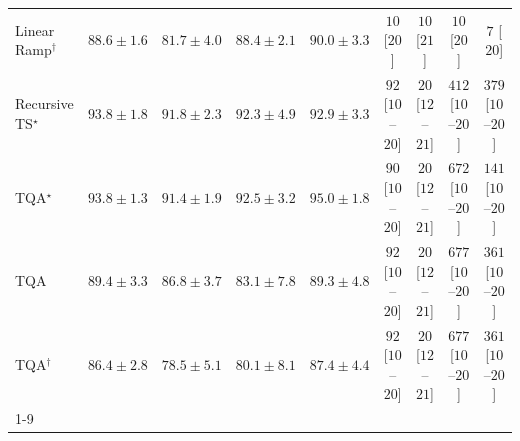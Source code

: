 \begin{tabular}{l|cccc|cccc|}
Linear Ramp$^\dagger$ & {\cellcolor[HTML]{0566A0}} \color[HTML]{F1F1F1} $88.6\pm 1.6$ & {\cellcolor[HTML]{2C89BD}} \color[HTML]{F1F1F1} $81.7\pm 4.0$ & {\cellcolor[HTML]{0567A2}} \color[HTML]{F1F1F1} $88.4\pm 2.1$ & {\cellcolor[HTML]{046198}} \color[HTML]{F1F1F1} $90.0\pm 3.3$ & {\cellcolor[HTML]{FFF6F2}} \color[HTML]{000000} $10$ [$20$] & {\cellcolor[HTML]{FFF6F2}} \color[HTML]{000000} $10$ [$21$] & {\cellcolor[HTML]{FFF6F2}} \color[HTML]{000000} $10$ [$20$] & {\cellcolor[HTML]{FFF6F2}} \color[HTML]{000000} $7$ [$20$] \\
Recursive TS$^\star$ & {\cellcolor[HTML]{034D79}} \color[HTML]{F1F1F1} $93.8\pm 1.8$ & {\cellcolor[HTML]{04598C}} \color[HTML]{F1F1F1} $91.8\pm 2.3$ & {\cellcolor[HTML]{045687}} \color[HTML]{F1F1F1} $92.3\pm 4.9$ & {\cellcolor[HTML]{045382}} \color[HTML]{F1F1F1} $92.9\pm 3.3$ & {\cellcolor[HTML]{FDE2DF}} \color[HTML]{000000} $92$ [$10$--$20$] & {\cellcolor[HTML]{FFF3EF}} \color[HTML]{000000} $20$ [$12$--$21$] & {\cellcolor[HTML]{F15C9F}} \color[HTML]{F1F1F1} $412$ [$10$--$20$] & {\cellcolor[HTML]{F76EA3}} \color[HTML]{F1F1F1} $379$ [$10$--$20$] \\
TQA$^\star$ & {\cellcolor[HTML]{034D79}} \color[HTML]{F1F1F1} $93.8\pm 1.3$ & {\cellcolor[HTML]{045B8F}} \color[HTML]{F1F1F1} $91.4\pm 1.9$ & {\cellcolor[HTML]{045585}} \color[HTML]{F1F1F1} $92.5\pm 3.2$ & {\cellcolor[HTML]{03466E}} \color[HTML]{F1F1F1} $95.0\pm 1.8$ & {\cellcolor[HTML]{FDE2DF}} \color[HTML]{000000} $90$ [$10$--$20$] & {\cellcolor[HTML]{FFF3EF}} \color[HTML]{000000} $20$ [$12$--$21$] & {\cellcolor[HTML]{7F0178}} \color[HTML]{F1F1F1} $672$ [$10$--$20$] & {\cellcolor[HTML]{FDD4D0}} \color[HTML]{000000} $141$ [$10$--$20$] \\
TQA & {\cellcolor[HTML]{04639B}} \color[HTML]{F1F1F1} $89.4\pm 3.3$ & {\cellcolor[HTML]{056DAC}} \color[HTML]{F1F1F1} $86.8\pm 3.7$ & {\cellcolor[HTML]{2081B9}} \color[HTML]{F1F1F1} $83.1\pm 7.8$ & {\cellcolor[HTML]{04639B}} \color[HTML]{F1F1F1} $89.3\pm 4.8$ & {\cellcolor[HTML]{FDE2DF}} \color[HTML]{000000} $92$ [$10$--$20$] & {\cellcolor[HTML]{FFF3EF}} \color[HTML]{000000} $20$ [$12$--$21$] & {\cellcolor[HTML]{7C0177}} \color[HTML]{F1F1F1} $677$ [$10$--$20$] & {\cellcolor[HTML]{F878A7}} \color[HTML]{F1F1F1} $361$ [$10$--$20$] \\
TQA$^\dagger$ & {\cellcolor[HTML]{056FAE}} \color[HTML]{F1F1F1} $86.4\pm 2.8$ & {\cellcolor[HTML]{4C99C5}} \color[HTML]{F1F1F1} $78.5\pm 5.1$ & {\cellcolor[HTML]{3B92C1}} \color[HTML]{F1F1F1} $80.1\pm 8.1$ & {\cellcolor[HTML]{056BA7}} \color[HTML]{F1F1F1} $87.4\pm 4.4$ & {\cellcolor[HTML]{FDE2DF}} \color[HTML]{000000} $92$ [$10$--$20$] & {\cellcolor[HTML]{FFF3EF}} \color[HTML]{000000} $20$ [$12$--$21$] & {\cellcolor[HTML]{7C0177}} \color[HTML]{F1F1F1} $677$ [$10$--$20$] & {\cellcolor[HTML]{F878A7}} \color[HTML]{F1F1F1} $361$ [$10$--$20$] \\
\cline{1-9}
\bottomrule
\end{tabular}
